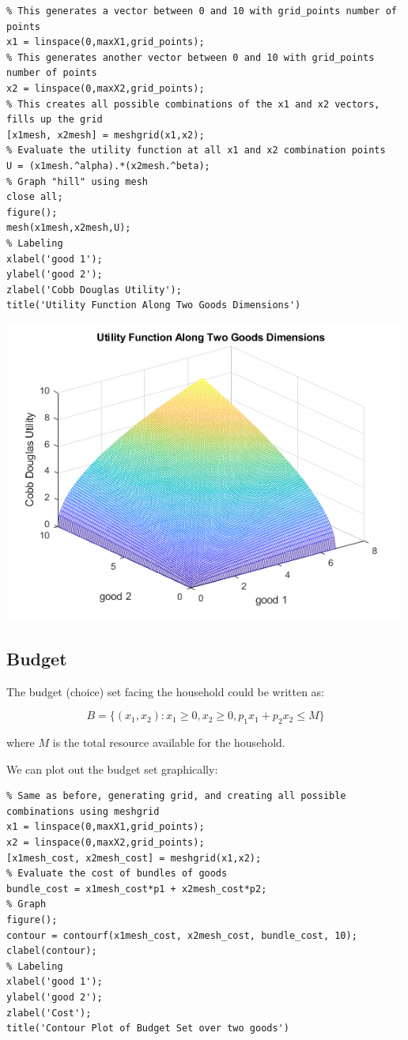 \documentclass[
]{book}
\begin{document}
\begin{verbatim}
% This generates a vector between 0 and 10 with grid_points number of points
x1 = linspace(0,maxX1,grid_points);
% This generates another vector between 0 and 10 with grid_points number of points
x2 = linspace(0,maxX2,grid_points);
% This creates all possible combinations of the x1 and x2 vectors, fills up the grid
[x1mesh, x2mesh] = meshgrid(x1,x2);
% Evaluate the utility function at all x1 and x2 combination points
U = (x1mesh.^alpha).*(x2mesh.^beta);
% Graph "hill" using mesh
close all;
figure();
mesh(x1mesh,x2mesh,U);
% Labeling
xlabel('good 1');
ylabel('good 2');
zlabel('Cobb Douglas Utility');
title('Utility Function Along Two Goods Dimensions')
\end{verbatim}

\includegraphics[width=5.20833in,height=\textheight]{img/twogoods_images/figure_0.png}

\hypertarget{budget}{%
\subsection{Budget}\label{budget}}

The budget (choice) set facing the household could be written as:

\[B=\lbrace (x_1 ,x_2 ):x_1 \ge 0,x_2 \ge 0,p_1 x_1 +p_2 x_2 \le M\rbrace\]

where \(M\) is the total resource available for the household.

We can plot out the budget set graphically:

\begin{verbatim}
% Same as before, generating grid, and creating all possible combinations using meshgrid
x1 = linspace(0,maxX1,grid_points);
x2 = linspace(0,maxX2,grid_points);
[x1mesh_cost, x2mesh_cost] = meshgrid(x1,x2);
% Evaluate the cost of bundles of goods
bundle_cost = x1mesh_cost*p1 + x2mesh_cost*p2;
% Graph
figure();
contour = contourf(x1mesh_cost, x2mesh_cost, bundle_cost, 10);
clabel(contour);
% Labeling
xlabel('good 1');
ylabel('good 2');
zlabel('Cost');
title('Contour Plot of Budget Set over two goods')
\end{verbatim}
\end{document}

